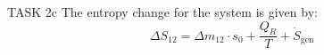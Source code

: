 TASK 2c  
The entropy change for the system is given by:  
\[
\Delta S_{12} = \Delta m_{12} \cdot s_0 + \frac{Q_R}{T} + \dot{S}_{\text{gen}}
\]